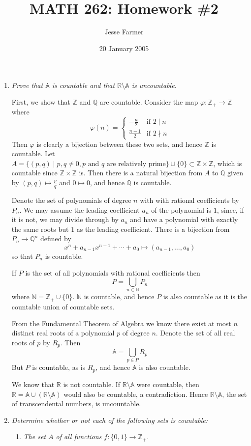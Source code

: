 \documentclass[letterpaper, 11pt]{article}
\title{MATH 262: Homework \#2}
\author{Jesse Farmer}
\date{20 January 2005}
\newcommand{\N}{\mathbb{N}}
\newcommand{\Z}{\mathbb{Z}}
\newcommand{\Q}{\mathbb{Q}}
\newcommand{\R}{\mathbb{R}}
\newcommand{\A}{\mathbb{A}}
\begin{document}
\maketitle
\begin{enumerate}
\item \emph{Prove that $\A$ is countable and that $\R \setminus \A$ is uncountable.}

First, we show that $\Z$ and $\Q$ are countable.  Consider the map $\varphi: \Z_+ \rightarrow \Z$ where
\[
\varphi(n) = \begin{cases} -\frac{n}{2} & \mbox{if } 2 \mid n \\ \frac{n-1}{2} & \mbox{if } 2 \nmid n\end{cases}
\]
Then $\varphi$ is clearly a bijection between these two sets, and hence $\Z$ is countable.  Let $A = \{(p,q) \mid p,q \neq 0, p \mbox{ and } q \mbox{ are relatively prime}\} \cup \{0\} \subset \Z \times \Z$, which is countable since $\Z \times \Z$ is.  Then there is a natural bijection from $A$ to $\Q$ given by $(p,q) \mapsto \frac{p}{q}$ and $0 \mapsto 0$, and hence $\Q$ is countable.

Denote the set of polynomials of degree $n$ with with rational coefficients by $P_n$.  We may assume the leading coefficient $a_n$ of the polynomial is $1$, since, if it is not, we may divide through by $a_n$ and have a polynomial with exactly the same roots but $1$ as the leading coefficient. There is a bijection from $P_n \rightarrow \Q^n$ defined by $$x^n + a_{n-1}x^{n-1} + \cdots + a_0 \mapsto (a_{n-1}, \ldots, a_0)$$ so that $P_n$ is countable.  

If $P$ is the set of all polynomials with rational coefficients then $$P = \bigcup_{n \in \N} P_n$$ where $\N = \Z_+ \cup \{0\}$.  $\N$ is countable, and hence $P$ is also countable as it is the countable union of countable sets.

From the Fundamental Theorem of Algebra we know there exist at most $n$ distinct real roots of a polynomial $p$ of degree $n$.  Denote the set of all real roots of $p$ by $R_p$.  Then $$\A = \bigcup_{p \in P} R_p$$  But $P$ is countable, as is $R_p$, and hence $\A$ is also countable.

We know that $\R$ is not countable.  If $\R \setminus \A$ were countable, then $\R = \A \cup (\R \setminus \A)$ would also be countable, a contradiction.  Hence $\R \setminus \A$, the set of transcendental numbers, is uncountable.

\item \emph{Determine whether or not each of the following sets is countable:}
\begin{enumerate}
\item \emph{The set $A$ of all functions $f: \{0,1\} \rightarrow \Z_+$.}


\end{enumerate}
\end{enumerate}
\end{document}
